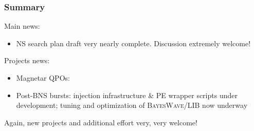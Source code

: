 \documentclass{beamer}
\begin{document}
\begin{frame}
    \frametitle{Summary}
    Main news:
    \begin{itemize}
        \item NS search plan draft very nearly complete.  Discussion extremely welcome!
    \end{itemize}
    Projects news:
    \begin{itemize}
        \item Magnetar QPOs:
        \item Post-BNS bursts: injection infrastructure \& PE wrapper scripts
            under development; tuning and optimization of
            \textsc{BayesWave}/\textsc{LIB} now underway
    \end{itemize}
    Again, new projects and additional effort very, very welcome!
\end{frame}
\end{document}
